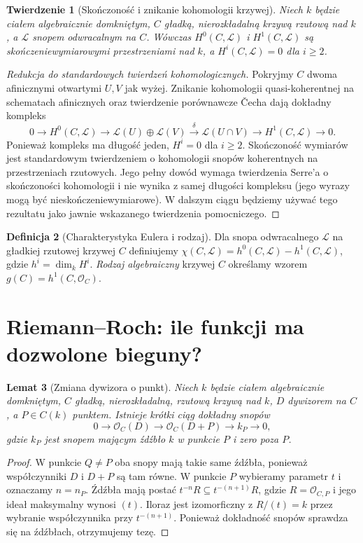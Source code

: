\documentclass[11pt,a4paper,openany]{report}
\numberwithin{equation}{section}
\theoremstyle{plain}
\newtheorem{twierdzenie}{Twierdzenie}[section]
\newtheorem{lemat}[twierdzenie]{Lemat}
\theoremstyle{definition}
\newtheorem{definicja}[twierdzenie]{Definicja}
\theoremstyle{remark}
\begin{document}
\begin{twierdzenie}[Skończoność i znikanie kohomologii krzywej]
\label{tw:curve-coh}
Niech $k$ będzie ciałem algebraicznie domkniętym,
$C$ gładką, nierozkładalną krzywą rzutową nad $k$,
a $\mathcal L$ snopem odwracalnym na $C$.
Wówczas $H^0(C,\mathcal L)$ i $H^1(C,\mathcal L)$ są
skończeniewymiarowymi przestrzeniami nad $k$,
a $H^i(C,\mathcal L)=0$ dla $i\ge2$.
\end{twierdzenie}
\begin{proof}[Redukcja do standardowych twierdzeń kohomologicznych]
Pokryjmy $C$ dwoma afinicznymi otwartymi $U,V$
jak wyżej. Znikanie kohomologii quasi-koherentnej
na schematach afinicznych oraz twierdzenie
porównawcze Čecha dają dokładny kompleks
\[
 0\longrightarrow H^0(C,\mathcal L)
 \longrightarrow\mathcal L(U)\oplus\mathcal L(V)
 \xrightarrow{\delta}\mathcal L(U\cap V)
 \longrightarrow H^1(C,\mathcal L)\longrightarrow0.
\]
Ponieważ kompleks ma długość jeden,
$H^i=0$ dla $i\ge2$.
Skończoność wymiarów jest standardowym
twierdzeniem o kohomologii snopów koherentnych
na przestrzeniach rzutowych. Jego pełny dowód
wymaga twierdzenia Serre'a o skończoności
kohomologii i nie wynika z samej długości
kompleksu (jego wyrazy mogą być nieskończeniewymiarowe).
W dalszym ciągu będziemy używać tego rezultatu
jako jawnie wskazanego twierdzenia pomocniczego.
\end{proof}

\begin{definicja}[Charakterystyka Eulera i rodzaj]
Dla snopa odwracalnego $\mathcal L$ na gładkiej
rzutowej krzywej $C$ definiujemy
$\chi(C,\mathcal L)=h^0(C,\mathcal L)-h^1(C,\mathcal L)$,
gdzie $h^i=\dim_kH^i$. \emph{Rodzaj algebraiczny}
krzywej $C$ określamy wzorem
$g(C)=h^1(C,\mathcal O_C)$.
\end{definicja}

\section{Riemann--Roch: ile funkcji ma dozwolone bieguny?}
\label{sec:rr}

\begin{lemat}[Zmiana dywizora o punkt]
\label{lem:exact-point}
Niech $k$ będzie ciałem algebraicznie domkniętym,
$C$ gładką, nierozkładalną, rzutową krzywą nad $k$,
$D$ dywizorem na $C$, a $P\in C(k)$ punktem.
Istnieje krótki ciąg dokładny snopów
\[
 0\longrightarrow\mathcal O_C(D)
 \longrightarrow\mathcal O_C(D+P)
 \longrightarrow k_P\longrightarrow0,
\]
gdzie $k_P$ jest snopem mającym źdźbło $k$
w punkcie $P$ i zero poza $P$.
\end{lemat}
\begin{proof}
W punkcie $Q\ne P$ oba snopy mają takie same
źdźbła, ponieważ współczynniki $D$ i $D+P$
są tam równe. W punkcie $P$ wybieramy parametr
$t$ i oznaczamy $n=n_P$. Źdźbła mają postać
$t^{-n}R\subseteq t^{-(n+1)}R$, gdzie
$R=\mathcal O_{C,P}$ i jego ideał maksymalny
wynosi $(t)$. Iloraz jest izomorficzny z
$R/(t)=k$ przez wybranie współczynnika przy
$t^{-(n+1)}$. Ponieważ dokładność snopów
sprawdza się na źdźbłach, otrzymujemy tezę.
\end{proof}
\end{document}
